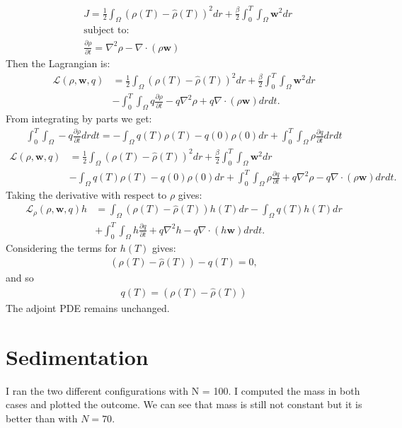 \documentclass[11pt, a4paper]{article}
\theoremstyle{definition}
\newcommand{\w}{\mathbf{w}}
\begin{document}
		\begin{align*}
		&J = \frac{1}{2} \int_\Omega (\rho(T) - \widehat \rho(T))^2 dr  + \frac{\beta}{2} \int_0^T\int_\Omega \w^2 dr\\
		&\text{subject to:}\\
		&\frac{\partial \rho}{\partial t} = \nabla^2 \rho - \nabla \cdot (\rho \w)
	\end{align*}
	Then the Lagrangian is:
	\begin{align*}
		\mathcal{L}(\rho,\w, q) &= \frac{1}{2} \int_\Omega (\rho(T) - \widehat \rho(T))^2 dr  + \frac{\beta}{2} \int_0^T\int_\Omega \w^2 dr\\
		&- \int_0^T \int_\Omega q\frac{\partial \rho}{\partial t} - q\nabla^2 \rho + q\nabla \cdot (\rho \w) dr dt.
	\end{align*}
	From integrating by parts we get:
	\begin{align*}
	\int_0^T \int_\Omega	-q\frac{\partial \rho}{\partial t} dr dt= - \int_\Omega q(T) \rho(T) - q(0) \rho(0) dr +  \int_0^T \int_\Omega	\rho \frac{\partial q}{\partial t} dr dt
	\end{align*}
		\begin{align*}
		\mathcal{L}(\rho,\w, q) &= \frac{1}{2} \int_\Omega (\rho(T) - \widehat \rho(T))^2 dr  + \frac{\beta}{2} \int_0^T\int_\Omega \w^2 dr\\
		&- \int_\Omega q(T) \rho(T) - q(0) \rho(0) dr + \int_0^T \int_\Omega \rho \frac{\partial q}{\partial t}   + q\nabla^2 \rho - q\nabla \cdot (\rho \w) dr dt.
	\end{align*}
	Taking the derivative with respect to $\rho $ gives:
	\begin{align*}
		\mathcal{L}_\rho(\rho,\w, q)h &= \int_\Omega  (\rho(T) - \widehat \rho(T)) h(T) dr - \int_\Omega q(T) h(T) dr\\
		&+ \int_0^T \int_\Omega h \frac{\partial q}{\partial t}   + q\nabla^2 h - q\nabla \cdot (h \w) dr dt.
	\end{align*}
	Considering the terms for $h(T)$ gives:
	\begin{align*}
		(\rho(T) - \widehat \rho(T)) - q(T) = 0,
	\end{align*}
	and so 
	\begin{align*}
	q(T) = (\rho(T) - \widehat \rho(T))
	\end{align*}
	The adjoint PDE remains unchanged.

	\section{Sedimentation}
	I ran the two different configurations with N = 100. I computed the mass in both cases and plotted the outcome. We can see that mass is still not constant but it is better than with $ N = 70$. 
	
\end{document}
